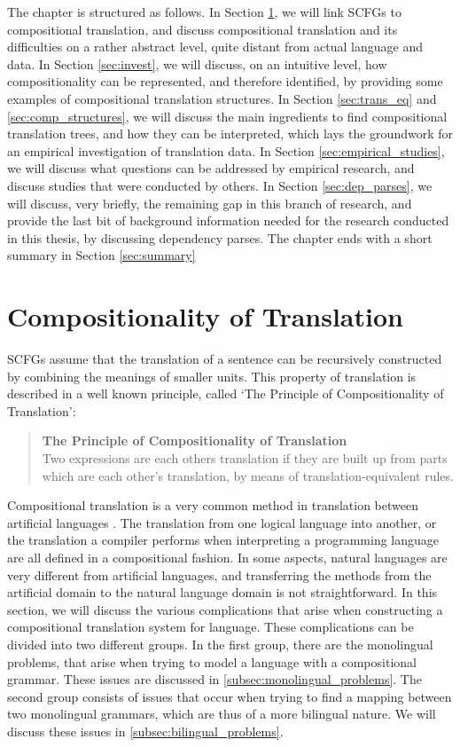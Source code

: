 The chapter is structured as follows. In Section \ref{sec:comp_trans}, we will link SCFGs to compositional translation, and discuss compositional translation and its difficulties on a rather abstract level, quite distant from actual language and data. In Section \ref{sec:invest}, we will discuss, on an intuitive level, how compositionality can be represented, and therefore identified, by providing some examples of compositional translation structures. In Section \ref{sec:trans_eq} and \ref{sec:comp_structures}, we will discuss the main ingredients to find compositional translation trees, and how they can be interpreted, which lays the groundwork for an empirical investigation of translation data. In Section \ref{sec:empirical_studies}, we will discuss what questions can be addressed by empirical research, and discuss studies that were conducted by others. In Section \ref{sec:dep_parses}, we will discuss, very briefly,  the remaining gap in this branch of research, and provide the last bit of background information needed for the research conducted in this thesis, by discussing dependency parses. The chapter ends with a short summary in Section \ref{sec:summary}

\section{Compositionality of Translation}
\label{sec:comp_trans}

SCFGs assume that the translation of a sentence can be recursively constructed by combining the meanings of smaller units. This property of translation is described in a well known principle, called `The Principle of Compositionality of Translation':

\begin{quote}
\textbf{The Principle of Compositionality of Translation}\\
Two expressions are each others translation if they are built up from parts which are each other's translation, by means of translation-equivalent rules. \citep[e.g.,][]{janssen1998algebraic} \end{quote}

Compositional translation is a very common method in translation between artificial languages \citep{janssen1996compositionality,janssen1998algebraic}. The translation from one logical language into another, or the translation a compiler performs when interpreting a programming language are all defined in a compositional fashion. In some aspects, natural languages are very different from artificial languages, and transferring the methods from the artificial domain to the natural language domain is not straightforward. In this section, we will discuss the various complications that arise when constructing a compositional translation system for language. These complications can be divided into two different groups. In the first group, there are the monolingual problems, that arise when trying to model a language with a compositional grammar. These issues are discussed in \ref{subsec:monolingual_problems}. The second group consists of issues that occur when trying to find a mapping between two monolingual grammars, which are thus of a more bilingual nature. We will discuss these issues in \ref{subsec:bilingual_problems}.

